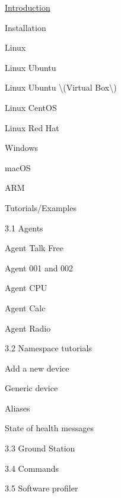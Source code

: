 
\begin{DoxyItemize}
\item \hyperlink{md_README}{Introduction}
\item Installation
\begin{DoxyItemize}
\item Linux
\begin{DoxyItemize}
\item Linux Ubuntu
\item Linux Ubuntu \textbackslash{}(Virtual Box\textbackslash{})
\item Linux Cent\+OS
\item Linux Red Hat
\end{DoxyItemize}
\item Windows
\item mac\+OS
\item A\+RM
\end{DoxyItemize}
\item Tutorials/\+Examples
\begin{DoxyItemize}
\item 3.1 Agents
\begin{DoxyItemize}
\item Agent Talk Free
\item Agent 001 and 002
\item Agent C\+PU
\item Agent Calc
\item Agent Radio
\end{DoxyItemize}
\item 3.2 Namespace tutorials
\begin{DoxyItemize}
\item Add a new device
\item Generic device
\item Aliases
\item State of health messages
\end{DoxyItemize}
\item 3.3 Ground Station
\item 3.4 Commands
\item 3.5 Software profiler 
\end{DoxyItemize}
\end{DoxyItemize}
